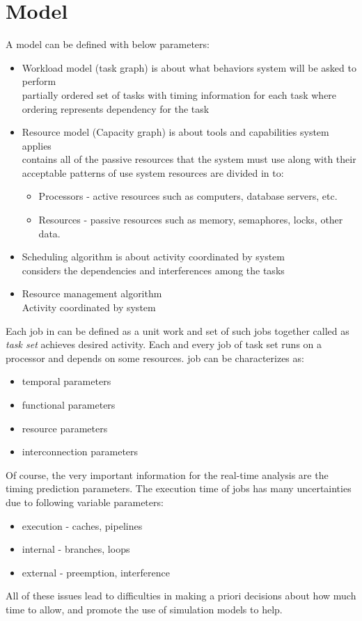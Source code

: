 \section{\rtsS Model}
A \rtsS model can be defined with below parameters:
\begin{itemize}
    \item Workload model (task graph) is about what behaviors system will be asked to perform
        \\ partially ordered set of tasks with timing information for each task where ordering represents dependency for the task
    \item Resource model (Capacity graph) is about tools and capabilities system applies
        \\ contains all of the passive resources that the system must use along with their acceptable patterns of use
    system resources are divided in to:
    \begin{itemize}
        \item Processors - active resources such as computers, database servers, etc.
        \item Resources - passive resources such as memory, semaphores, locks, other data.
    \end{itemize}
    \item Scheduling algorithm is about activity coordinated by system
        \\ considers the dependencies and interferences among the tasks
    \item Resource management algorithm
    \\ Activity coordinated by system
\end{itemize}

Each job in \rtsS can be defined as a unit work and set of such jobs together called as \textit{task set} achieves desired activity. Each and every job of task set runs on a processor and depends on some resources.
\rtsS job can be characterizes as:
\begin{itemize}
    \item temporal parameters
    \item functional parameters
    \item resource parameters
    \item interconnection parameters
\end{itemize}
Of course, the very important information for the real-time analysis are the timing prediction parameters. The execution time of jobs has many uncertainties due to following variable parameters:
\begin{itemize}
    \item execution - caches, pipelines
    \item internal - branches, loops
    \item external - preemption, interference
\end{itemize}
All of these issues lead to difficulties in making a priori decisions about how much time to allow, and promote the use of simulation models to help.

